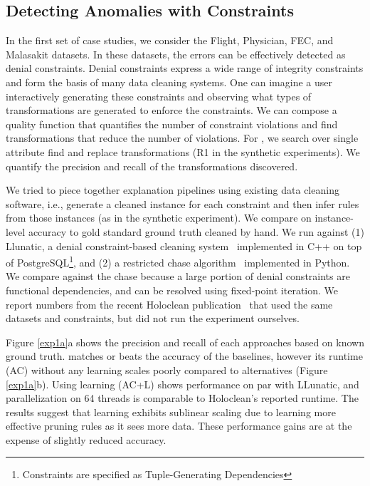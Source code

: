\subsection{Detecting Anomalies with Constraints}
In the first set of case studies, we consider the Flight, Physician, FEC, and Malasakit datasets. In these datasets, the errors can be effectively detected as denial constraints. Denial constraints express a wide range of integrity constraints and form the basis of many data cleaning systems.  One can imagine a user interactively generating these constraints and observing what types of transformations are generated to enforce the constraints. We can compose a quality function that quantifies the number of constraint violations and find transformations that reduce the number of violations. For \sys, we search over single attribute find and replace transformations (R1 in the synthetic experiments). We quantify the precision and recall of the transformations discovered. 

  We tried to piece together explanation pipelines using existing data cleaning software, i.e., generate a cleaned instance for each constraint and then infer rules from those instances (as in the synthetic experiment). We compare \sys on instance-level accuracy to gold standard ground truth cleaned by hand. We run against (1) Llunatic, a denial constraint-based cleaning system~\cite{DBLP:conf/sigmod/DallachiesaEEEIOT13} implemented in C++ on top of PostgreSQL\footnote{Constraints are specified as Tuple-Generating Dependencies}, and (2) a restricted chase algorithm~\cite{benedikt2017benchmarking} implemented in Python. We compare against the chase because a large portion of denial constraints are functional dependencies, and can be resolved using fixed-point iteration.  We report numbers from the recent Holoclean publication~\cite{rekatsinas2017holoclean} that used the same datasets and constraints, but did not run the experiment ourselves.

 Figure \ref{exp1a}a shows the precision and recall of each approaches based on known ground truth. \sys matches or beats the accuracy of the baselines, however its runtime (AC) without any learning scales poorly compared to alternatives (Figure~ \ref{exp1a}b).  Using learning (AC+L) shows performance on par with LLunatic, and parallelization on 64 threads is comparable to Holoclean's reported runtime. The results suggest that learning exhibits sublinear scaling due to \sys learning more effective pruning rules as it sees more data.  These performance gains are at the expense of slightly reduced accuracy. 

